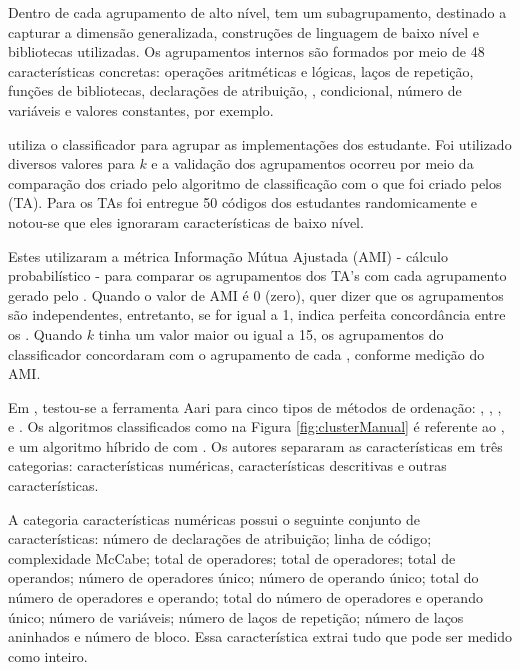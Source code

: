 	    Dentro de cada agrupamento de alto nível, tem um subagrupamento, destinado a
	    capturar a dimensão generalizada, construções de linguagem de baixo nível e
	    bibliotecas utilizadas. Os agrupamentos internos são formados por meio de 48
	    características concretas: operações aritméticas e lógicas, laços de repetição,
	    funções de bibliotecas, declarações de atribuição, , condicional,
	    número de variáveis e valores constantes, por exemplo.
	    
	     utiliza o classificador  para agrupar
	    as implementações dos estudante. Foi utilizado diversos valores para $k$
	    e a validação dos agrupamentos ocorreu por meio da comparação dos 
	    criado pelo algoritmo de classificação com o que foi criado pelos
	     (TA). Para os TAs foi entregue 50 códigos
	    dos estudantes randomicamente e notou-se que eles ignoraram características
	    de baixo nível.
	    
	    Estes utilizaram a métrica Informação Mútua Ajustada (AMI) - cálculo
	    probabilístico - para comparar os agrupamentos dos TA's com cada agrupamento
	    gerado pelo . Quando o valor de AMI é 0 (zero), quer dizer
	    que os agrupamentos são independentes, entretanto, se for igual a 1, indica
	    perfeita concordância entre os . Quando $k$ tinha um
	    valor maior ou igual a 15, os agrupamentos do classificador concordaram com
	    o agrupamento de cada , conforme medição do AMI.
	    
	    Em , testou-se a ferramenta Aari para cinco tipos
	    de métodos de ordenação: , ,
	    ,  e . Os
	    algoritmos classificados como  na Figura \ref{fig:clusterManual}
	    é referente ao ,  e um algoritmo híbrido de
	     com . Os autores separaram as
	    características em três categorias: características numéricas, características
	    descritivas e outras características.
	    
	    A categoria características numéricas possui o seguinte conjunto de características:
	    número de declarações de atribuição; linha de código; complexidade McCabe; total de
	    operadores; total de operadores; total de operandos; número de operadores único;
	    número de operando único; total do número de operadores e operando; total do
	    número de operadores e operando único; número de variáveis; número de laços de
	    repetição; número de laços aninhados e número de bloco. Essa característica
	    extrai tudo que pode ser medido como inteiro.
	    
